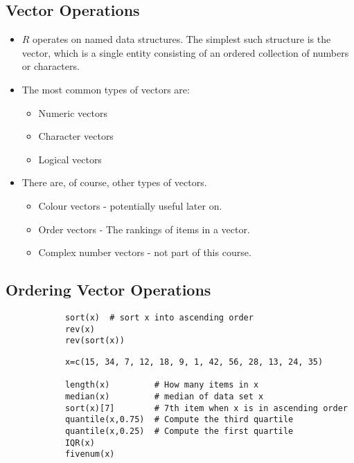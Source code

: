 \documentclass[a4paper,12pt]{article}
\begin{document}
\begin{itemize}
\begin{itemize}
		\section{Vector Operations}
		\begin{itemize}
			\item $R$ operates on named data structures. The simplest such
			structure is the vector, which is a single entity consisting of an
			ordered collection of numbers or characters.
			
			\item The most common types of vectors are:
			\begin{itemize}
				\item Numeric vectors \item Character vectors \item Logical
				vectors
			\end{itemize}
			
			\item There are, of course, other types of vectors.
			\begin{itemize}
				\item Colour vectors - potentially useful later on.
				\item Order vectors - The rankings of items in a vector.
				\item Complex number vectors - not part of this course.
			\end{itemize}
		\end{itemize}
		\subsection{Ordering Vector Operations}
		\begin{framed}
			\begin{verbatim}
			sort(x)  # sort x into ascending order
			rev(x)
			rev(sort(x))
			\end{verbatim}
		\end{framed}
		
		\begin{framed}
			\begin{verbatim}
			x=c(15, 34, 7, 12, 18, 9, 1, 42, 56, 28, 13, 24, 35)
			
			length(x)         # How many items in x
			median(x)         # median of data set x
			sort(x)[7]        # 7th item when x is in ascending order
			quantile(x,0.75)  # Compute the third quartile
			quantile(x,0.25)  # Compute the first quartile
			IQR(x)            
			fivenum(x)
			

\end{verbatim}
\end{framed}
\end{itemize}
\end{itemize}
\end{document}
